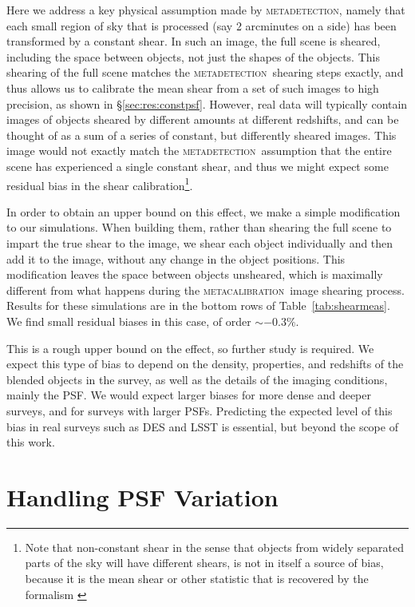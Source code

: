 \documentclass[fleqn,useAMS,usenatbib]{mnras}
\newcommand{\mcal}{\textsc{metacalibration}}
\newcommand{\mdet}{\textsc{metadetection}}
\begin{document}
Here we address a key physical assumption made by \mdet, namely that each small
region of sky that is processed (say 2 arcminutes on a side) has been
transformed by a constant shear.  In such an image, the full scene is sheared,
including the space between objects, not just the shapes of the objects. This
shearing of the full scene matches the \mdet\ shearing steps exactly, and thus
allows us to calibrate the mean shear from a set of such images to high
precision, as shown in \S \ref{sec:res:constpsf}.  However, real data will
typically contain images of objects sheared by different amounts at different
redshifts, and can be thought of as a sum of a series of constant, but
differently sheared images.  This image would not exactly match the \mdet\
assumption that the entire scene has experienced a single constant shear, and
thus we might expect some residual bias in the shear calibration\footnote{Note
that non-constant shear in the sense that objects from widely separated parts
of the sky will have different shears, is not in itself a source of bias,
because it is the mean shear or other statistic that is recovered by the
formalism \citep{SheldonMcal2017}}.

In order to obtain an upper bound on this effect, we make a simple modification to our
simulations. When building them, rather than shearing the full scene to impart
the true shear to the image, we shear each object individually and then add it
to the image, without any change in the object positions. This modification
leaves the space between objects unsheared, which is maximally different from
what happens during the \mcal\ image shearing process. Results for these
simulations are in the bottom rows of Table~\ref{tab:shearmeas}. We find small
residual biases in this case, of order $\sim-0.3\%$.

This is a rough upper bound on the effect, so further study is required.  We
expect this type of bias to depend on the density, properties, and redshifts of
the blended objects in the survey, as well as the details of the imaging
conditions, mainly the PSF.  We would expect larger biases for more dense and
deeper surveys, and for surveys with larger PSFs.  Predicting the expected
level of this bias in real surveys such as DES and LSST is
essential, but beyond the scope of this work.

\section{Handling PSF Variation}
\label{sec:psfvar}
\end{document}
